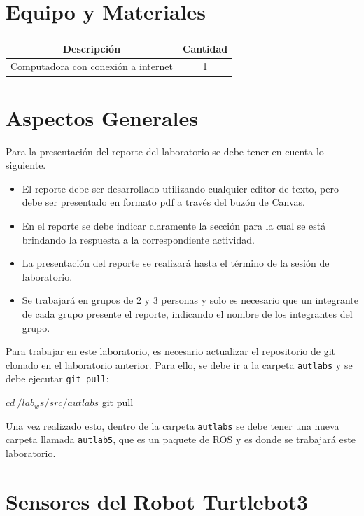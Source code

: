 \documentclass[a4paper,11pt]{robotlabs}
\begin{document}
\section{Equipo y Materiales}

\begin{table}[h]
  \centering
  \begin{tabular}{cc}
    \toprule
    \textbf{Descripción} & \textbf{Cantidad} \\
    \midrule
    Computadora con conexi\'on a internet & 1 \\
    \bottomrule
    \end{tabular}
  \end{table}

\section{Aspectos Generales}

Para la presentación del reporte  del laboratorio se debe tener en cuenta lo
siguiente.
\begin{itemize}
\item El reporte debe ser desarrollado utilizando cualquier editor de texto,
  pero debe ser presentado en formato pdf a través del buzón de
  Canvas.
\item En el reporte se debe indicar claramente la sección para la cual se está
  brindando la respuesta a la correspondiente actividad.
\item La presentación del reporte se realizará hasta el término de la sesión de
  laboratorio.
\item Se trabajará en grupos de 2 y 3 personas y solo es necesario que un
  integrante de cada grupo presente el reporte, indicando el nombre de los
  integrantes del grupo.
\end{itemize}
Para trabajar en este laboratorio, es necesario actualizar el repositorio de
git clonado en el laboratorio anterior. Para ello, se debe ir a la carpeta
\texttt{autlabs} y se debe ejecutar \texttt{git pull}:
\begin{listingshell}
$ cd ~/lab_ws/src/autlabs
$ git pull
\end{listingshell}
\noindent Una vez realizado esto, dentro de la carpeta \texttt{autlabs} se debe
tener una nueva carpeta llamada \texttt{autlab5}, que es un paquete de ROS y es
donde se trabajará este laboratorio.


\section{Sensores del Robot Turtlebot3}
\end{document}
